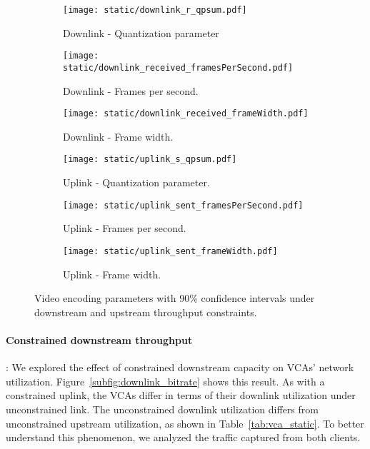 \begin{figure*}[t]
    \begin{subfigure}[t]{0.33\textwidth}
    		\centering
        \texttt{[image: static/downlink\_r\_qpsum.pdf]}
        \caption{Downlink - Quantization parameter}
 		\label{subfig:downlink_video_qp}
    \end{subfigure}%
    \hfill
	\begin{subfigure}[t]{0.33\textwidth}
        \centering
        \texttt{[image: static/downlink\_received\_framesPerSecond.pdf]}
    \caption{Downlink - Frames per second.}
    \label{subfig:downlink_frames_per_second}
    \end{subfigure}%
    \hfill
	\begin{subfigure}[t]{0.33\textwidth}
        \centering
        \texttt{[image: static/downlink\_received\_frameWidth.pdf]}
    \caption{Downlink - Frame width.}
    \label{subfig:downlink_frame_width}
    \end{subfigure}
    \newline
        \begin{subfigure}[t]{0.33\textwidth}
    		\centering
        \texttt{[image: static/uplink\_s\_qpsum.pdf]}
        \caption{Uplink - Quantization parameter.}
 		\label{subfig:uplink_video_qp}
    \end{subfigure}%
    \hfill
	\begin{subfigure}[t]{0.33\textwidth}
        \centering
        \texttt{[image: static/uplink\_sent\_framesPerSecond.pdf]}
    \caption{Uplink - Frames per second.}
    \label{subfig:uplink_frames_per_second}
    \end{subfigure}%
    \hfill
	\begin{subfigure}[t]{0.33\textwidth}   
        \centering
        \texttt{[image: static/uplink\_sent\_frameWidth.pdf]}
    \caption{Uplink - Frame width.}
    \label{subfig:uplink_frame_width}
    \end{subfigure}
	\caption{Video encoding parameters with 90\% confidence intervals under
    downstream and upstream throughput constraints.}
	\label{fig:video_qual}
\end{figure*}



\paragraph{Constrained downstream throughput}: We explored the effect of constrained
downstream capacity
on VCAs' network utilization. Figure~\ref{subfig:downlink_bitrate} shows this
result.
As with a constrained uplink, the VCAs differ in terms of their downlink
utilization under unconstrained link. The unconstrained downlink utilization
differs from unconstrained upstream utilization, as shown in
Table~\ref{tab:vca_static}. To better understand this phenomenon, we analyzed the traffic
captured from both clients. 

